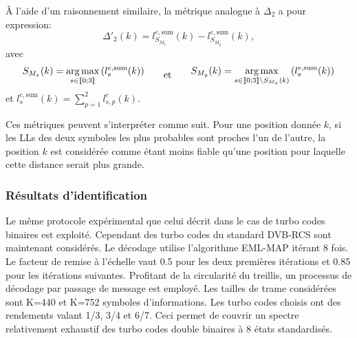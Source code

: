 À l'aide d'un raisonnement similaire, la métrique analogue à $\Delta_2$ a pour expression: 
\begin{equation}
	\Delta'_2(k) = l^{e,\text{sum}}_{S_{M_x}}(k)-l^{e,\text{sum}}_{S_{M_y}}(k),
\end{equation}
avec
\begin{equation*}	\begin{split}
	S_{M_x}(k) = \operatorname*{arg\,max}\limits_{s\in\llbracket0;3\rrbracket}\left(l^{e,\text{sum}}_s(k)\right)
	\end{split}\qquad\text{et}\qquad
	\begin{split}
		S_{M_y}(k) = \operatorname*{arg\,max}\limits_{s\in\llbracket0;3\rrbracket\setminus{S_{M_x}(k)}}\left(l^{e,\text{sum}}_s(k)\right)
	\end{split} 
\end{equation*}
et $l^{e,\text{sum}}_s(k) = \sum\limits_{p=1}^2l^e_{s,p}(k)$.

Ces métriques peuvent s'interpréter comme suit. Pour une position donnée $k$, si les LLs des deux symboles les 
plus probables sont proches l'un de l'autre, la position $k$ est considérée comme étant moins fiable qu'une position pour
laquelle cette distance serait plus grande.

\subsubsection{Résultats d'identification}
Le même protocole expérimental que celui décrit dans le cas de turbo codes binaires est exploité. Cependant des turbo codes du standard DVB-RCS
sont maintenant considérés. Le décodage utilise l'algorithme EML-MAP itérant 8 fois. Le facteur de remise à l'échelle 
vaut 0.5 pour les deux premières itérations et 0.85 pour les itérations suivantes. Profitant de la circularité du treillis, 
un processus de décodage par passage de message est employé. Les tailles de trame considérées sont K=440
et K=752 symboles d'informations. Les turbo codes choisis ont des rendements valant 1/3, 3/4 et 6/7. Ceci permet de 
couvrir un spectre relativement exhaustif des turbo codes double binaires à 8 états standardisés. 

